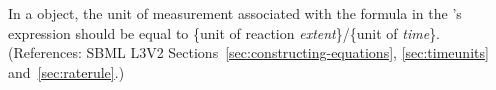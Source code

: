 In a \KineticLaw object, the unit of measurement associated with the
formula in the \KineticLaw's  expression should be equal to
\{unit of reaction \emph{extent}\}/\{unit of \emph{time}\}.  (References:
SBML L3V2 Sections~\ref{sec:constructing-equations}, \ref{sec:timeunits}
and~\ref{sec:raterule}.)
